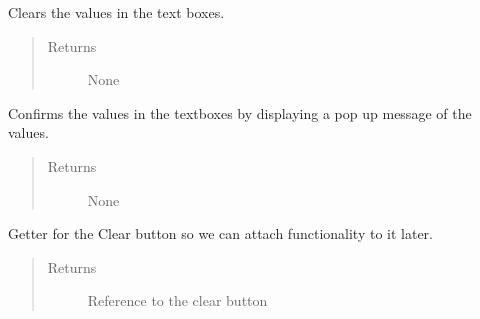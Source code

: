 \documentclass[letterpaper,10pt,english]{sphinxmanual}
\begin{document}
\begin{fulllineitems}
\begin{fulllineitems}
\begin{quote}
\begin{description}
\end{description}\end{quote}

\end{fulllineitems}


\begin{fulllineitems}
\label{\detokenize{index:src.Views.View_TrackingScreen.TrackingWindow.clearValues}}
Clears the values in the text boxes.
\begin{quote}\begin{description}
\item[{Returns}] \leavevmode
None

\end{description}\end{quote}

\end{fulllineitems}


\begin{fulllineitems}
\label{\detokenize{index:src.Views.View_TrackingScreen.TrackingWindow.confirmValues}}
Confirms the values in the textboxes by displaying a pop up message of the values.
\begin{quote}\begin{description}
\item[{Returns}] \leavevmode
None

\end{description}\end{quote}

\end{fulllineitems}


\begin{fulllineitems}
\label{\detokenize{index:src.Views.View_TrackingScreen.TrackingWindow.del_BtnClear}}
Getter for the Clear button so we can attach functionality to it later.
\begin{quote}\begin{description}
\item[{Returns}] \leavevmode
Reference to the clear button


\end{description}
\end{quote}
\end{fulllineitems}
\end{fulllineitems}
\end{document}
